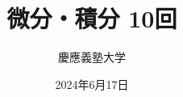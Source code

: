 \documentclass[dvipdfmx,cjk,10.2pt]{beamer}
\theoremstyle{definition}
\begin{document}
\title{微分・積分 10回} 
\author{慶應義塾大学}            %
\date{2024年6月17日}
\maketitle
















\end{document}
